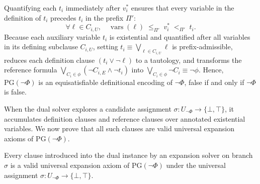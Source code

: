 \documentclass[runningheads]{llncs}
\DeclareMathOperator{\vars}{vars}
\newcommand{\Bool}{\{\bot,\top\}}
\newcommand{\PG}{\mathrm{PG}}
\begin{document}
Quantifying each $t_i$ immediately after $v_i^*$ ensures that every variable in the definition of $t_i$ precedes $t_i$ in the prefix $\Pi'$:
\begin{equation}
    \forall \ell \in C_{i,U}, \quad \vars(\ell) \;\leq_{\Pi'}\; v_i^* \;{<}_{\Pi'}\; t_i .
    \label{eq:prefix-order-ti}
\end{equation}
Because each auxiliary variable $t_i$ is existential and quantified after all variables in its defining subclause $C_{i,U}$, setting $t_i \equiv \bigvee_{\ell \in C_{i,U}} \ell$ is prefix-admissible, reduces each definition clause $(t_i \lor \neg\ell)$ to a tautology, and transforms the reference formula $\bigvee_{C_i \in \phi} (\neg C_{i,E} \land \neg t_i)$ into $\bigvee_{C_i \in \phi} \neg C_i \equiv \neg\phi$.
Hence, $\PG(\neg\Phi)$ is an equisatisfiable definitional encoding of $\neg\Phi$, false if and only if $\neg\Phi$ is false.

When the dual solver explores a candidate assignment $\sigma : U_{\neg\Phi} \to \Bool$, it accumulates definition clauses and reference clauses over annotated existential variables.
We now prove that all such clauses are valid universal expansion axioms of $\PG(\neg\Phi)$.

\begin{lemma}
    \label{lem:axiom-correspondence}
    Every clause introduced into the dual instance by an expansion solver on branch $\sigma$ is a valid universal expansion axiom of $\PG(\neg\Phi)$ under the universal assignment $\sigma : U_{\neg\Phi} \to \Bool$.
\end{lemma}
\end{document}
